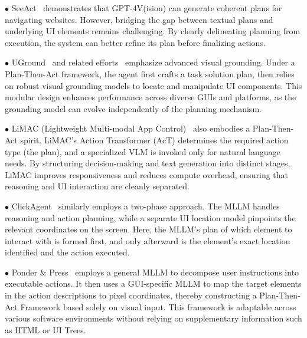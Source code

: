 \noindent$\bullet$ SeeAct~\cite{zheng2024gpt} demonstrates that GPT-4V(ision)\cite{achiam2023gpt} can generate coherent plans for navigating websites. However, bridging the gap between textual plans and underlying UI elements remains challenging. By clearly delineating planning from execution, the system can better refine its plan before finalizing actions.

\noindent$\bullet$ UGround~\cite{gou2024navigating} and related efforts~\cite{you2024ferret,zhang2024ui-hawk} emphasize advanced visual grounding. Under a Plan-Then-Act framework, the agent first crafts a task solution plan, then relies on robust visual grounding models to locate and manipulate UI components. This modular design enhances performance across diverse GUIs and platforms, as the grounding model can evolve independently of the planning mechanism.

\noindent$\bullet$ LiMAC (Lightweight Multi-modal App Control)~\cite{christianos2024lightweight} also embodies a Plan-Then-Act spirit. LiMAC’s Action Transformer (AcT) determines the required action type (the plan), and a specialized VLM is invoked only for natural language needs. By structuring decision-making and text generation into distinct stages, LiMAC improves responsiveness and reduces compute overhead, ensuring that reasoning and UI interaction are cleanly separated.

\noindent$\bullet$ ClickAgent~\cite{hoscilowicz2024clickagent} similarly employs a two-phase approach. The MLLM handles reasoning and action planning, while a separate UI location model pinpoints the relevant coordinates on the screen. Here, the MLLM’s plan of which element to interact with is formed first, and only afterward is the element's exact location identified and the action executed.

\noindent$\bullet$ Ponder \& Press~\cite{wang2024ponder} employs a general MLLM to decompose user instructions into executable actions. It then uses a GUI-specific MLLM to map the target elements in the action descriptions to pixel coordinates, thereby constructing a Plan-Then-Act Framework based solely on visual input. This framework is adaptable across various software environments without relying on supplementary information such as HTML or UI Trees.


